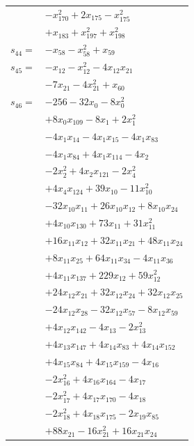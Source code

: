 \begin{longtable}{@{}r@{\;}l@{}}
 & \(\displaystyle -x_{170}^{2} +2x_{175} -x_{175}^{2}\) \\
 & \(\displaystyle +x_{183} +x_{197}^{2} +x_{198}^{2}\) \\[3pt]
\(s_{44}=\) & \(\displaystyle -x_{58} -x_{58}^{2} +x_{59}\) \\[3pt]
\(s_{45}=\) & \(\displaystyle -x_{12} -x_{12}^{2} -4x_{12}x_{21}\) \\
 & \(\displaystyle -7x_{21} -4x_{21}^{2} +x_{60}\) \\[3pt]
\(s_{46}=\) & \(\displaystyle -256 -32x_{0} -8x_{0}^{2}\) \\
 & \(\displaystyle +8x_{0}x_{109} -8x_{1} +2x_{1}^{2}\) \\
 & \(\displaystyle -4x_{1}x_{14} -4x_{1}x_{15} -4x_{1}x_{83}\) \\
 & \(\displaystyle -4x_{1}x_{84} +4x_{1}x_{114} -4x_{2}\) \\
 & \(\displaystyle -2x_{2}^{2} +4x_{2}x_{121} -2x_{4}^{2}\) \\
 & \(\displaystyle +4x_{4}x_{124} +39x_{10} -11x_{10}^{2}\) \\
 & \(\displaystyle -32x_{10}x_{11} +26x_{10}x_{12} +8x_{10}x_{24}\) \\
 & \(\displaystyle +4x_{10}x_{130} +73x_{11} +31x_{11}^{2}\) \\
 & \(\displaystyle +16x_{11}x_{12} +32x_{11}x_{21} +48x_{11}x_{24}\) \\
 & \(\displaystyle +8x_{11}x_{25} +64x_{11}x_{34} -4x_{11}x_{36}\) \\
 & \(\displaystyle +4x_{11}x_{137} +229x_{12} +59x_{12}^{2}\) \\
 & \(\displaystyle +24x_{12}x_{21} +32x_{12}x_{24} +32x_{12}x_{25}\) \\
 & \(\displaystyle -24x_{12}x_{28} -32x_{12}x_{57} -8x_{12}x_{59}\) \\
 & \(\displaystyle +4x_{12}x_{142} -4x_{13} -2x_{13}^{2}\) \\
 & \(\displaystyle +4x_{13}x_{147} +4x_{14}x_{83} +4x_{14}x_{152}\) \\
 & \(\displaystyle +4x_{15}x_{84} +4x_{15}x_{159} -4x_{16}\) \\
 & \(\displaystyle -2x_{16}^{2} +4x_{16}x_{164} -4x_{17}\) \\
 & \(\displaystyle -2x_{17}^{2} +4x_{17}x_{170} -4x_{18}\) \\
 & \(\displaystyle -2x_{18}^{2} +4x_{18}x_{175} -2x_{19}x_{85}\) \\
 & \(\displaystyle +88x_{21} -16x_{21}^{2} +16x_{21}x_{24}\) \\

\end{longtable}
